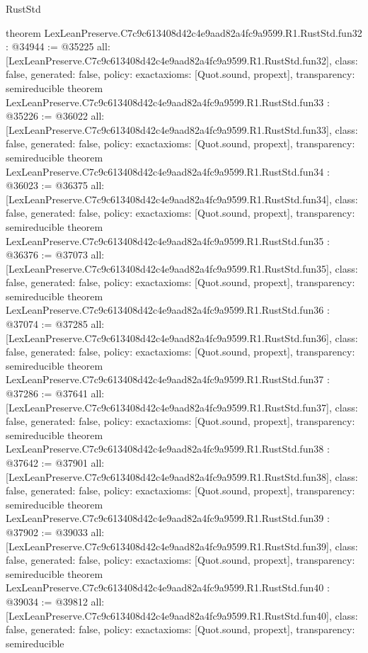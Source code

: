 \begin{lexlean}{RustStd}
\begin{coremodule}
{}
theorem LexLeanPreserve.C7c9c613408d42c4e9aad82a4fc9a9599.R1.RustStd.fun32 : @34944 := @35225 {
  all: [LexLeanPreserve.C7c9c613408d42c4e9aad82a4fc9a9599.R1.RustStd.fun32],
  class: false,
  generated: false,
  policy: exact{axioms: [Quot.sound, propext]},
  transparency: semireducible
}
theorem LexLeanPreserve.C7c9c613408d42c4e9aad82a4fc9a9599.R1.RustStd.fun33 : @35226 := @36022 {
  all: [LexLeanPreserve.C7c9c613408d42c4e9aad82a4fc9a9599.R1.RustStd.fun33],
  class: false,
  generated: false,
  policy: exact{axioms: [Quot.sound, propext]},
  transparency: semireducible
}
theorem LexLeanPreserve.C7c9c613408d42c4e9aad82a4fc9a9599.R1.RustStd.fun34 : @36023 := @36375 {
  all: [LexLeanPreserve.C7c9c613408d42c4e9aad82a4fc9a9599.R1.RustStd.fun34],
  class: false,
  generated: false,
  policy: exact{axioms: [Quot.sound, propext]},
  transparency: semireducible
}
theorem LexLeanPreserve.C7c9c613408d42c4e9aad82a4fc9a9599.R1.RustStd.fun35 : @36376 := @37073 {
  all: [LexLeanPreserve.C7c9c613408d42c4e9aad82a4fc9a9599.R1.RustStd.fun35],
  class: false,
  generated: false,
  policy: exact{axioms: [Quot.sound, propext]},
  transparency: semireducible
}
theorem LexLeanPreserve.C7c9c613408d42c4e9aad82a4fc9a9599.R1.RustStd.fun36 : @37074 := @37285 {
  all: [LexLeanPreserve.C7c9c613408d42c4e9aad82a4fc9a9599.R1.RustStd.fun36],
  class: false,
  generated: false,
  policy: exact{axioms: [Quot.sound, propext]},
  transparency: semireducible
}
theorem LexLeanPreserve.C7c9c613408d42c4e9aad82a4fc9a9599.R1.RustStd.fun37 : @37286 := @37641 {
  all: [LexLeanPreserve.C7c9c613408d42c4e9aad82a4fc9a9599.R1.RustStd.fun37],
  class: false,
  generated: false,
  policy: exact{axioms: [Quot.sound, propext]},
  transparency: semireducible
}
theorem LexLeanPreserve.C7c9c613408d42c4e9aad82a4fc9a9599.R1.RustStd.fun38 : @37642 := @37901 {
  all: [LexLeanPreserve.C7c9c613408d42c4e9aad82a4fc9a9599.R1.RustStd.fun38],
  class: false,
  generated: false,
  policy: exact{axioms: [Quot.sound, propext]},
  transparency: semireducible
}
theorem LexLeanPreserve.C7c9c613408d42c4e9aad82a4fc9a9599.R1.RustStd.fun39 : @37902 := @39033 {
  all: [LexLeanPreserve.C7c9c613408d42c4e9aad82a4fc9a9599.R1.RustStd.fun39],
  class: false,
  generated: false,
  policy: exact{axioms: [Quot.sound, propext]},
  transparency: semireducible
}
theorem LexLeanPreserve.C7c9c613408d42c4e9aad82a4fc9a9599.R1.RustStd.fun40 : @39034 := @39812 {
  all: [LexLeanPreserve.C7c9c613408d42c4e9aad82a4fc9a9599.R1.RustStd.fun40],
  class: false,
  generated: false,
  policy: exact{axioms: [Quot.sound, propext]},
  transparency: semireducible
}
\end{coremodule}
\end{lexlean}
